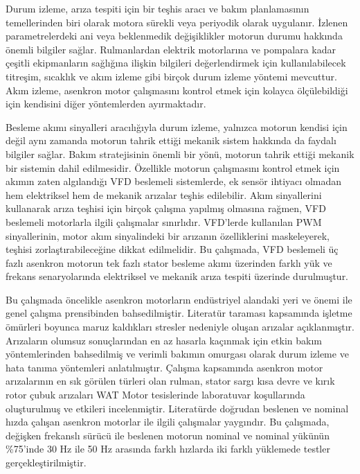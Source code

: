Durum izleme, arıza tespiti için bir teşhis aracı ve bakım planlamasının temellerinden biri olarak motora sürekli veya periyodik olarak uygulanır. İzlenen parametrelerdeki ani veya beklenmedik değişiklikler motorun durumu hakkında önemli bilgiler sağlar. Rulmanlardan elektrik motorlarına ve pompalara kadar çeşitli ekipmanların sağlığına ilişkin bilgileri değerlendirmek için kullanılabilecek titreşim, sıcaklık ve akım izleme gibi birçok durum izleme yöntemi mevcuttur. Akım izleme, asenkron motor çalışmasını kontrol etmek için kolayca ölçülebildiği için kendisini diğer yöntemlerden ayırmaktadır.

Besleme akımı sinyalleri aracılığıyla durum izleme, yalnızca motorun kendisi için değil aynı zamanda motorun tahrik ettiği mekanik sistem hakkında da faydalı bilgiler sağlar. Bakım stratejisinin önemli bir yönü, motorun tahrik ettiği mekanik bir sistemin dahil edilmesidir. Özellikle motorun çalışmasını kontrol etmek için akımın zaten algılandığı VFD beslemeli sistemlerde, ek sensör ihtiyacı olmadan hem elektriksel hem de mekanik arızalar teşhis edilebilir. Akım sinyallerini kullanarak arıza teşhisi için birçok çalışma yapılmış olmasına rağmen, VFD beslemeli motorlarla ilgili çalışmalar sınırlıdır. VFD'lerde kullanılan PWM sinyallerinin, motor akım sinyalindeki bir arızanın özelliklerini maskeleyerek, teşhisi zorlaştırabileceğine dikkat edilmelidir. Bu çalışmada, VFD beslemeli üç fazlı asenkron motorun tek fazlı stator besleme akımı üzerinden farklı yük ve frekans senaryolarında elektriksel ve mekanik arıza tespiti üzerinde durulmuştur.

Bu çalışmada öncelikle asenkron motorların endüstriyel alandaki yeri ve önemi ile genel çalışma prensibinden bahsedilmiştir. Literatür taraması kapsamında işletme ömürleri boyunca maruz kaldıkları stresler nedeniyle oluşan arızalar açıklanmıştır. Arızaların olumsuz sonuçlarından en az hasarla kaçınmak için etkin bakım yöntemlerinden bahsedilmiş ve verimli bakımın omurgası olarak durum izleme ve hata tanıma yöntemleri anlatılmıştır. Çalışma kapsamında asenkron motor arızalarının en sık görülen türleri olan rulman, stator sargı kısa devre ve kırık rotor çubuk arızaları WAT Motor tesislerinde laboratuvar koşullarında oluşturulmuş ve etkileri incelenmiştir. Literatürde doğrudan beslenen ve nominal hızda çalışan asenkron motorlar ile ilgili çalışmalar yaygındır. Bu çalışmada, değişken frekanslı sürücü ile beslenen motorun nominal ve nominal yükünün \%75'inde 30 Hz ile 50 Hz arasında farklı hızlarda iki farklı yüklemede testler gerçekleştirilmiştir.

